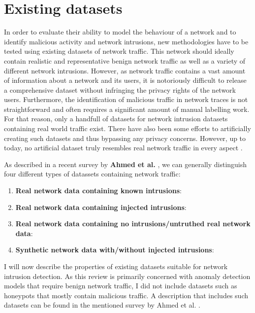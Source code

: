 \documentclass[a4paper,12pt,twoside]{report}
\begin{document}
\section{Existing datasets}

In order to evaluate their ability to model the behaviour of a network and to identify malicious activity and network intrusions, new methodologies have to be tested using existing datasets of network traffic. This network should ideally contain realistic and representative benign network traffic as well as a variety of different network intrusions. However, as  network traffic contains a vast amount of information about a network and its users, it is notoriously difficult to release a comprehensive dataset without infringing the privacy rights of the network users. 
Furthermore, the identification of malicious traffic in network traces is not straightforward and often requires a significant amount of manual labelling work.
For that reason, only a handfull of datasets for network intrusion datasets containing real world traffic exist. There have also been some efforts to artificially creating such datasets and thus bypassing any privacy concerns. However, up to today, no artificial dataset truly resembles real network traffic in every aspect \cite{nisioti2018intrusion}.

As described in a recent survey by \textbf{Ahmed et al.} \cite{ahmed2016survey}, we can generally distinguish four different types of datassets containing network traffic:

\begin{enumerate}

\item \textbf{Real network data containing known intrusions}: 

\item \textbf{Real network data containing injected intrusions}:

\item \textbf{Real network data containing no intrusions/untruthed real network data}:

\item \textbf{Synthetic network data with/without injected intrusions}:

\end{enumerate}

I will now describe the properties of existing datasets suitable for network intrusion detection. As this review is primarily concerned with anomaly detection models that require benign network traffic, I did not include datasets such as honeypots that mostly contain malicious traffic. A description that includes such datasets can be found in the mentioned survey by Ahmed et al. \cite{ahmed2016survey}.
\end{document}
